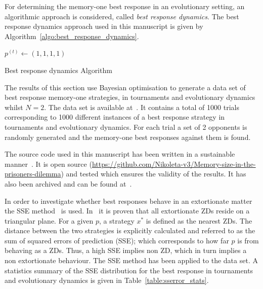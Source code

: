 \documentclass[10pt]{article}
\begin{document}
For determining the memory-one best response in an evolutionary setting, an
algorithmic approach is considered, called \textit{best response dynamics}. The
best response dynamics approach used in this manuscript is given by
Algorithm~\ref{algo:best_response_dynamics}.

\begin{center}
\begin{minipage}{.55\textwidth}
\begin{algorithm}[H]
       $p^{(t)}\leftarrow (1, 1, 1, 1)$\;
       \caption{Best response dynamics Algorithm}
       \label{algo:best_response_dynamics}
\end{algorithm}
\end{minipage}
\end{center}

The results of this section use Bayesian optimisation to generate a data set of best response
memory-one strategies, in tournaments and evolutionary dynamics whilst \(N=2\).
The data set is available at~\cite{glynatsi2019}. It contains a total of 1000 trials
corresponding to 1000 different instances of a best response strategy in
tournaments and evolutionary dynamics. For each trial a set of 2 opponents is
randomly generated and the memory-one best responses against them is found.

The source code used in this manuscript has been written in a sustainable manner~\cite{Benureau2018}.
It is open source (\url{https://github.com/Nikoleta-v3/Memory-size-in-the-prisoners-dilemma})
and tested which ensures the validity of the results. It has also been archived
and can be found at~\cite{nikoleta_glynatsi_2019}.

In order to investigate whether best responses
behave in an extortionate matter the SSE method~\cite{Knight2019} is used.
In~\cite{Knight2019} it is proven that
all extortionate ZDs reside on a triangular plane. For a given \(p\), a strategy
\(x^*\) is defined as the nearest ZDs. The distance between
the two strategies is explicitly calculated and referred to as the sum of squared
errors of prediction (SSE); which corresponds to how far \(p\) is from behaving as a ZDs.
Thus, a high SSE implies non ZD, which in turn implies a non extortionate behaviour.
The SSE method has been applied to the data set.
A statistics summary
of the SSE distribution for the best response in tournaments and evolutionary dynamics is
given in Table~\ref{table:sserror_stats}.
\end{document}
